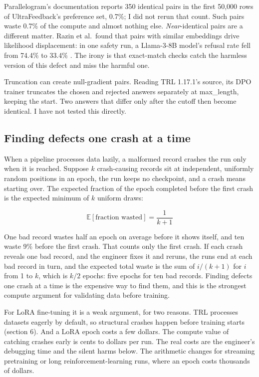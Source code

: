 Parallelogram's documentation reports 350 identical pairs in the first 50,000 rows of UltraFeedback's preference set, 0.7\%; I did not rerun that count. Such pairs waste 0.7\% of the compute and almost nothing else. \emph{Near}-identical pairs are a different matter. Razin et al.~found that pairs with similar embeddings drive likelihood displacement: in one safety run, a Llama-3-8B model's refusal rate fell from 74.4\% to 33.4\% \citep{razin2025}. The irony is that exact-match checks catch the harmless version of this defect and miss the harmful one.

 Truncation can create null-gradient pairs. Reading TRL 1.17.1's source, its DPO trainer truncates the chosen and rejected answers separately at max\_length, keeping the start. Two answers that differ only after the cutoff then become identical. I have not tested this directly.

\subsection{Finding defects one crash at a time}

When a pipeline processes data lazily, a malformed record crashes the run only when it is reached. Suppose $k$ crash-causing records sit at independent, uniformly random positions in an epoch, the run keeps no checkpoint, and a crash means starting over. The expected fraction of the epoch completed before the first crash is the expected minimum of $k$ uniform draws:

\begin{equation}\label{eq:waste}
\mathbb{E}[\text{fraction wasted}] = \frac{1}{k+1}
\end{equation}

One bad record wastes half an epoch on average before it shows itself, and ten waste 9\% before the first crash. That counts only the first crash. If each crash reveals one bad record, and the engineer fixes it and reruns, the runs end at each bad record in turn, and the expected total waste is the sum of $i/(k+1)$ for $i$ from 1 to $k$, which is $k/2$ epochs: five epochs for ten bad records. Finding defects one crash at a time is the expensive way to find them, and this is the strongest compute argument for validating data before training.

For LoRA fine-tuning it is a weak argument, for two reasons. TRL processes datasets eagerly by default, so structural crashes happen before training starts (section 6). And a LoRA epoch costs a few dollars.  The compute value of catching crashes early is cents to dollars per run. The real costs are the engineer's debugging time and the silent harms below. The arithmetic changes for streaming pretraining or long reinforcement-learning runs, where an epoch costs thousands of dollars.

